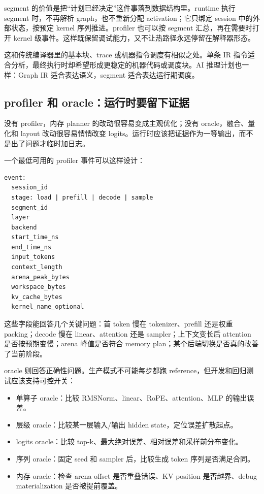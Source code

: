 segment 的价值是把“计划已经决定”这件事落到数据结构里。runtime 执行 segment 时，不再解析 graph，也不重新分配 activation；它只绑定 session 中的外部状态，按预定 kernel 序列推进。profiler 也可以按 segment 汇总，再在需要时打开 kernel 级事件。这样既保留调试能力，又不让热路径永远停留在解释器形态。

这和传统编译器里的基本块、trace 或机器指令调度有相似之处。单条 IR 指令适合分析，最终执行时却希望形成更稳定的机器代码或调度块。AI 推理计划也一样：Graph IR 适合表达语义，segment 适合表达运行期调度。

\subsection{profiler 和 oracle：运行时要留下证据}

没有 profiler，内存 planner 的改动很容易变成主观优化；没有 oracle，融合、量化和 layout 改动很容易悄悄改变 logits。运行时应该把证据作为一等输出，而不是出了问题才临时加日志。

一个最低可用的 profiler 事件可以这样设计：

\begin{lstlisting}[numbers=none,caption={推理 profiler 事件字段}]
event:
  session_id
  stage: load | prefill | decode | sample
  segment_id
  layer
  backend
  start_time_ns
  end_time_ns
  input_tokens
  context_length
  arena_peak_bytes
  workspace_bytes
  kv_cache_bytes
  kernel_name_optional
\end{lstlisting}

这些字段能回答几个关键问题：首 token 慢在 tokenizer、prefill 还是权重 packing；decode 慢在 linear、attention 还是 sampler；上下文变长后 attention 是否按预期变慢；arena 峰值是否符合 memory plan；某个后端切换是否真的改善了当前阶段。

oracle 则回答正确性问题。生产模式不可能每步都跑 reference，但开发和回归测试应该支持可控开关：

\begin{itemize}
  \item 单算子 oracle：比较 RMSNorm、linear、RoPE、attention、MLP 的输出误差。
  \item 层级 oracle：比较某一层输入/输出 hidden state，定位误差扩散起点。
  \item logits oracle：比较 top-k、最大绝对误差、相对误差和采样前分布变化。
  \item 序列 oracle：固定 seed 和 sampler 后，比较生成 token 序列是否满足合同。
  \item 内存 oracle：检查 arena offset 是否重叠错误、KV position 是否越界、debug materialization 是否被提前覆盖。
\end{itemize}

